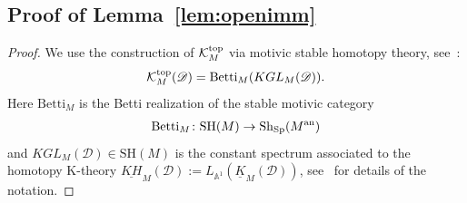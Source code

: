 \documentclass [11pt,oneside,a4paper,mathscr]{amsart}
\theoremstyle{definition}
\begin{document}
\subsection{Proof of Lemma~\ref{lem:openimm}}\label{subsec:motivic}
\begin{proof}
	We use the construction of $\mathcal{K}_M^{\rm{top}}$ via motivic stable homotopy theory, 
	see~\cite[Proposition~7.7]{Moulinos}: 
	\begin{align*}
		\mathcal{K}_M^{\rm{top}}(\mathscr{D})=\mathrm{Betti}_M(KGL_M(\mathscr{D})). 
	\end{align*}
	Here $\mathrm{Betti}_M$ is the Betti realization of the stable 
	motivic category 
	\begin{align*}
		\mathrm{Betti}_M \colon \mathrm{SH}(M) \to \mathrm{Sh}_{\mathrm{Sp}}(M^{\rm{an}})
	\end{align*}
	and $KGL_M(\mathscr{D}) \in \mathrm{SH}(M)$ is the constant spectrum 
	associated to the homotopy K-theory 
	$\underline{KH}_{M}(\mathscr{D}):=L_{\mathbb{A}^1}(\underline{K}_M(\mathscr{D}))$, 
	see~\cite[Section~7.3]{Moulinos} for details of the notation. 
	

\end{proof}
\end{document}
